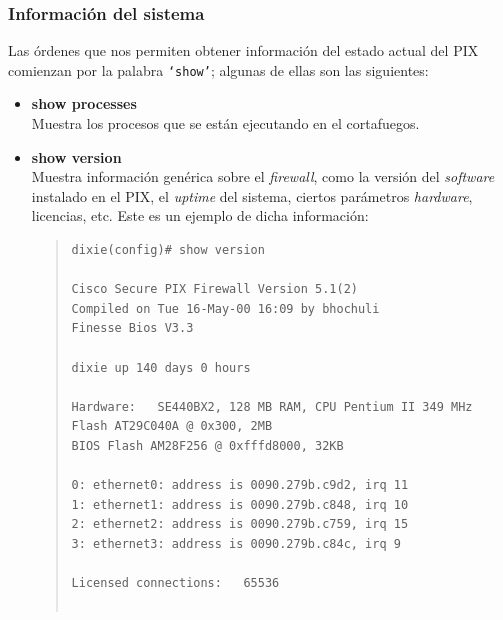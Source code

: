 \subsubsection{Informaci\'on del sistema}
Las \'ordenes que nos permiten obtener informaci\'on del estado actual del PIX comienzan por la palabra {\tt `show'}; algunas de 
ellas son las siguientes:
\begin{itemize}
\item {\bf show processes}\\
Muestra los procesos que se est\'an ejecutando en el cortafuegos.
\item {\bf show version}\\
Muestra informaci\'on gen\'erica sobre el {\it firewall}, como la versi\'on del {\it software} instalado en el PIX, el {\it uptime}
del sistema, ciertos par\'ametros {\it hardware}, licencias, etc. Este es un ejemplo de dicha informaci\'on:
\begin{quote}
\begin{verbatim}
dixie(config)# show version

Cisco Secure PIX Firewall Version 5.1(2)
Compiled on Tue 16-May-00 16:09 by bhochuli
Finesse Bios V3.3

dixie up 140 days 0 hours

Hardware:   SE440BX2, 128 MB RAM, CPU Pentium II 349 MHz
Flash AT29C040A @ 0x300, 2MB
BIOS Flash AM28F256 @ 0xfffd8000, 32KB

0: ethernet0: address is 0090.279b.c9d2, irq 11
1: ethernet1: address is 0090.279b.c848, irq 10
2: ethernet2: address is 0090.279b.c759, irq 15
3: ethernet3: address is 0090.279b.c84c, irq 9

Licensed connections:   65536


\end{verbatim}
\end{quote}
\end{itemize}
